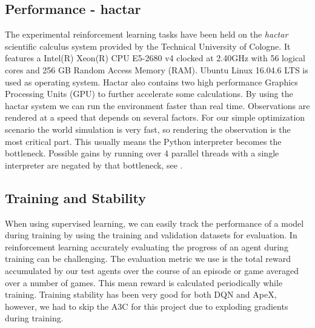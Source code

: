 \documentclass[12pt,a4paper]{article}
\begin{document}
\subsection{Performance - hactar}
The experimental reinforcement learning tasks have been held on the {\it hactar} scientific calculus system provided by the Technical University of Cologne. It features a Intel(R) Xeon(R) CPU E5-2680 v4 clocked at 2.40GHz with 56 logical cores and 256 GB Random Access Memory (RAM). Ubuntu Linux 16.04.6 LTS is used as operating system. Hactar also contains two high performance Graphics Processing Units (GPU) to further accelerate some calculations. By using the hactar system we can run the environment faster than real time. Observations are rendered at a speed that depends on several factors. For our simple optimization scenario the world simulation is very fast, so rendering the observation is the most critical part. This usually means the Python interpreter becomes the bottleneck. Possible gains by running over 4 parallel threads with a single interpreter are negated by that bottleneck, see \cite{DBLP:journals/corr/abs-1708-04782}.
\subsection{Training and Stability}
When using supervised learning, we can easily track the performance of a model during training by using the training and validation datasets for evaluation. In reinforcement learning accurately evaluating the progress of an agent during training can be challenging. The evaluation metric we use is the total reward accumulated by our test agents over the course of an episode or game averaged over a number of games. This mean reward is calculated periodically while training. Training stability has been very good for both DQN and ApeX, however, we had to skip the A3C for this project due to exploding gradients during training.
\end{document}
